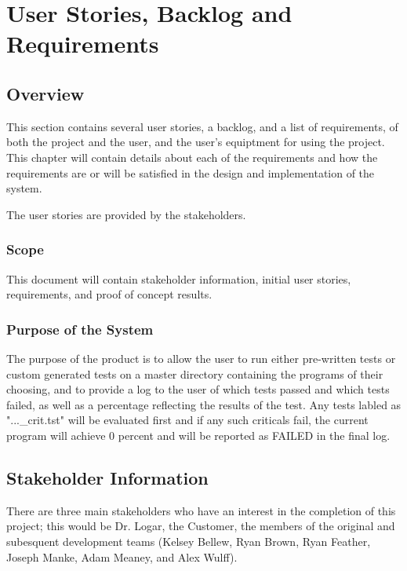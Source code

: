 \chapter{User Stories, Backlog and Requirements}
\section{Overview}

This section contains several user stories, a backlog, and a list of requirements, of
both the project and the user, and the user's equiptment for using the project. This
chapter will contain 
details about each of the requirements and how the requirements are or will be 
satisfied in the design and implementation of the system.

The user stories are provided by the stakeholders.





\subsection{Scope}

This document will contain stakeholder information, initial user stories, requirements, and 
proof of concept results.



\subsection{Purpose of the System}
The purpose of the product is to allow the user to run either pre-written tests or custom generated tests on a master directory containing the programs of their choosing, and to provide a log to the user of which tests passed and which tests failed, as well as a percentage reflecting the results of the test.  Any tests labled as "...\_crit.tst" will be evaluated first and if any such criticals fail, the current program will achieve 0 percent and will be reported as FAILED in the final log.

\section{ Stakeholder Information}

There are three main stakeholders who have an interest in the completion of this project;
this would be Dr. Logar, the Customer, the members of the original and subesquent development teams (Kelsey Bellew, 
Ryan Brown, Ryan Feather, Joseph Manke, Adam Meaney, and Alex Wulff).


